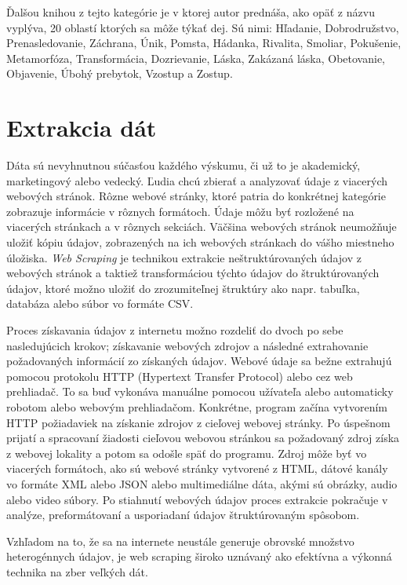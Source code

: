 Ďalšou knihou z tejto kategórie je  \cite{Tobias:1993} v ktorej autor prednáša, ako opäť z názvu vyplýva, 20 oblastí ktorých sa môže týkať dej. Sú nimi: Hľadanie, Dobrodružstvo, Prenasledovanie, Záchrana, Únik, Pomsta, Hádanka, Rivalita, Smoliar, Pokušenie, Metamorfóza, Transformácia, Dozrievanie, Láska, Zakázaná láska, Obetovanie, Objavenie, Úbohý prebytok, Vzostup a Zostup. 


\section{Extrakcia dát}
Dáta sú nevyhnutnou súčasťou každého výskumu, či už to je akademický, marketingový alebo vedecký. Ľudia chcú zbierať a analyzovať údaje z viacerých webových stránok. Rôzne webové stránky, ktoré patria do konkrétnej kategórie zobrazuje informácie v rôznych formátoch. Údaje môžu byť rozložené na viacerých stránkach a v rôznych sekciách. Väčšina webových stránok neumožňuje uložiť kópiu údajov, zobrazených na ich webových stránkach do vášho miestneho úložiska. \textit{Web Scraping} je technikou extrakcie neštruktúrovaných údajov z webových stránok a taktiež transformáciou týchto údajov do štruktúrovaných údajov, ktoré možno uložiť do zrozumiteľnej štruktúry ako napr. tabuľka, databáza alebo súbor vo formáte CSV. 

Proces získavania údajov z internetu možno rozdeliť do dvoch po sebe nasledujúcich krokov; získavanie webových zdrojov a následné extrahovanie požadovaných informácií zo získaných údajov. Webové údaje sa bežne extrahujú pomocou protokolu HTTP (Hypertext Transfer Protocol) alebo cez web prehliadač. To sa buď vykonáva manuálne pomocou užívateľa alebo automaticky robotom alebo webovým prehliadačom. Konkrétne, program začína vytvorením HTTP požiadaviek na získanie zdrojov z cieľovej webovej stránky. Po úspešnom prijatí a spracovaní žiadosti cieľovou webovou stránkou sa požadovaný zdroj získa z webovej lokality a potom sa odošle späť do programu. Zdroj môže byť vo viacerých formátoch, ako sú webové stránky vytvorené z HTML, dátové kanály vo formáte XML alebo JSON alebo multimediálne dáta, akými sú obrázky, audio alebo video súbory. Po stiahnutí webových údajov proces extrakcie pokračuje v analýze, preformátovaní a usporiadaní údajov štruktúrovaným spôsobom. 

Vzhľadom na to, že sa na internete neustále generuje obrovské množstvo heterogénnych údajov, je web scraping široko uznávaný ako efektívna a výkonná technika na zber veľkých dát. 

